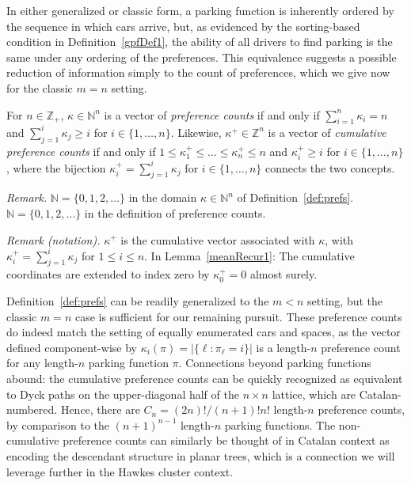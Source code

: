 \documentclass[opre,nonblindrev]{informs3_no_remark}
\newcommand{\tr}{\textcolor{red}}
\begin{document}
In either generalized or classic form, a parking function is inherently ordered by the sequence in which cars arrive, but, as evidenced by the sorting-based condition in Definition~\ref{gpfDef1}, the ability of all drivers to find parking is the same under any ordering of the preferences. This equivalence suggests a possible reduction of information simply to the count of preferences, which we give now for the classic $m = n$ setting.


\begin{definition} \label{def:prefs}
For $n \in \mathbb{Z}_+$, $\kappa \in \mathbb{N}^n$ is a vector of \emph{preference counts} if and only if $\sum_{i=1}^n \kappa_i = n$ and $\sum_{j=1}^i \kappa_j \ge i$ for $i \in \{1, \dots, n\}$. Likewise, $\kappa^+ \in \mathbb{Z}^n$ is a vector of \emph{cumulative preference counts} if and only if $1 \leq \kappa_1^+ \leq \dots \leq \kappa_n^+ \leq n$ and $\kappa^+_i \geq i$ for $i \in \{1, \dots, n\}$, where the bijection $\kappa_i^+ = \sum_{j=1}^i \kappa_j$ for $i \in \{1,\dots,n\}$ connects the two concepts.
\hfill \Halmos 
\end{definition}

\noindent\textit{Remark.} $\mathbb{N}=\{0,1,2,\dots\}$ in the domain $\kappa\in\mathbb{N}^n$ of Definition~\ref{def:prefs}. $\mathbb{N}=\{0,1,2,\dots\}$ in the definition of preference counts.

\noindent\textit{Remark (notation).} $\kappa^+$ is the cumulative vector associated with $\kappa$, with $\kappa_i^+=\sum_{j=1}^i\kappa_j$ for $1\leq i\leq n$. In Lemma~\ref{meanRecur1}: The cumulative coordinates are extended to index zero by $\kappa_0^+=0$ almost surely.



Definition~\ref{def:prefs} can be readily generalized to the $m < n$ setting, but the classic $m=n$ case is sufficient for our remaining pursuit. These preference counts do indeed match the setting of equally enumerated cars and spaces, as the vector defined component-wise by $\kappa_i(\pi) = |\{\ell : \pi_\ell = i \}|$ is a length-$n$ preference count for any length-$n$ parking function $\pi$. Connections beyond parking functions abound: the cumulative preference counts can be quickly recognized as equivalent to Dyck paths on the upper-diagonal half of the $n \times n$ lattice, which are Catalan-numbered. Hence, there are $C_n = (2n)!/(n+1)!n!$ length-$n$ preference counts, by comparison to the $(n+1)^{n-1}$ length-$n$ parking functions.
The non-cumulative preference counts can similarly be thought of in Catalan context as encoding the descendant structure in planar trees, which is a connection we will leverage further in the Hawkes cluster context. 
\end{document}
